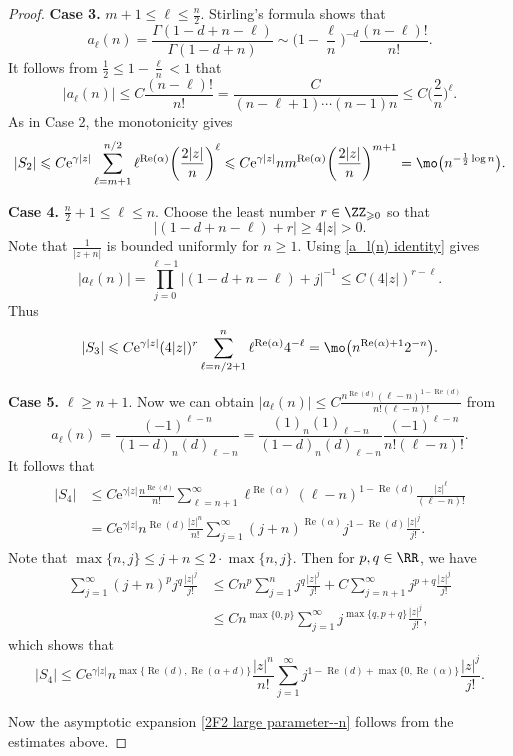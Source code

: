 \begin{proof}
	\textbf{Case 3.} $m+1\leqslant \ell\leqslant \frac{n}{2}$. Stirling's formula shows that
	\[a_\ell(n)=\frac{\Gamma(1-d+n-\ell)}{\Gamma(1-d+n)}\sim \biggl(1-\frac{\ell}{n}\biggr)^{-d}\frac{(n-\ell)!}{n!}.\]
	It follows from $\frac{1}{2}\leqslant 1-\frac{\ell}{n}<1$ that
	\[|a_\ell(n)|\leqslant C \frac{(n-\ell)!}{n!}=\frac{C}{(n-\ell+1)\cdots(n-1)n}\leqslant C\bigg(\frac{2}{n}\bigg)^{\ell}.\]
	As in Case 2, the monotonicity gives
	\[|S_2|\leqslant C\mathrm{e}^{\gamma|z|}\sum_{\ell=m+1}^{n/2}\ell^{\operatorname{Re}(\alpha)}\bigg(\frac{2|z|}{n}\bigg)^{\ell}\leqslant C\mathrm{e}^{\gamma|z|}nm^{\operatorname{Re}(\alpha)}\bigg(\frac{2|z|}{n}\bigg)^{m+1}=\mo\big(n^{-\frac{1}{2}\log n}\big).\]
	
	\textbf{Case 4.} $\frac{n}{2}+1\leqslant \ell\leqslant n$. Choose the least number $r\in\ZZ_{\geqslant 0}$ so that
	\[|(1-d+n-\ell)+r|\geqslant 4|z|>0.\]
	Note that $\frac{1}{|z+n|}$ is bounded uniformly for $n\geqslant 1$. Using \eqref{a_l(n) identity} gives
	\[|a_{\ell}(n)|=\prod_{j=0}^{\ell-1}\big|(1-d+n-\ell)+j\big|^{-1}\leqslant C(4|z|)^{r-\ell}.\]
	Thus
	\[|S_3|\leqslant C\mathrm{e}^{\gamma|z|}(4|z|)^r\sum_{\ell=n/2+1}^{n}\ell^{\operatorname{Re}(\alpha)}4^{-\ell}=\mo\big(n^{\operatorname{Re}(\alpha)+1}2^{-n}\big).\]
	
	\textbf{Case 5.} $\ell\geqslant n+1$. Now we can obtain $|a_\ell(n)|\leqslant C\frac{n^{\operatorname{Re}(d)}(\ell-n)^{1-\operatorname{Re}(d)}}{n!(\ell-n)!}$ from
	\[a_\ell(n)=\frac{(-1)^{\ell-n}}{(1-d)_n(d)_{\ell-n}}=\frac{(1)_n(1)_{\ell-n}}{(1-d)_n(d)_{\ell-n}}\frac{(-1)^{\ell-n}}{n!(\ell-n)!}.\]
	It follows that
	\begin{align*}
\begin{aligned}
		|S_4|&{} \leqslant C\mathrm{e}^{\gamma|z|}\frac{n^{\operatorname{Re}(d)}}{n!}\sum_{\ell=n+1}^{\infty}\ell^{\operatorname{Re}(\alpha)}(\ell-n)^{1-\operatorname{Re}(d)}\frac{|z|^{\ell}}{(\ell-n)!}\\
		&{} =C\mathrm{e}^{\gamma|z|}n^{\operatorname{Re}(d)}\frac{|z|^n}{n!}\sum_{j=1}^{\infty}(j+n)^{\operatorname{Re}(\alpha)}j^{1-\operatorname{Re}(d)}\frac{|z|^j}{j!}.
\end{aligned}
	\end{align*}
	Note that $\max\{n,j\}\leqslant j+n\leqslant 2\cdot\max\{n,j\}$. Then for $p,q\in\RR$, we have
	\begin{align*}
		\sum_{j=1}^{\infty}(j+n)^p j^q\frac{|z|^j}{j!}&{}\leqslant Cn^p\sum_{j=1}^{n}j^q\frac{|z|^j}{j!}+C\sum_{j=n+1}^{\infty}j^{p+q}\frac{|z|^j}{j!}\\
		&{} \leqslant Cn^{\max\{0,p\}}\sum_{j=1}^{\infty}j^{\max\{q,p+q\}}\frac{|z|^j}{j!},
	\end{align*}
	which shows that
	\[|S_4|\leqslant C\mathrm{e}^{\gamma|z|}n^{\max\{\operatorname{Re}(d),\operatorname{Re}(\alpha+d)\}}\frac{|z|^n}{n!}\sum_{j=1}^{\infty}j^{1-\operatorname{Re}(d)+\max\{0,\operatorname{Re}(\alpha)\}}\frac{|z|^j}{j!}.\]
	
	Now the asymptotic expansion \eqref{2F2 large parameter--n} follows from the estimates above.
\end{proof}

